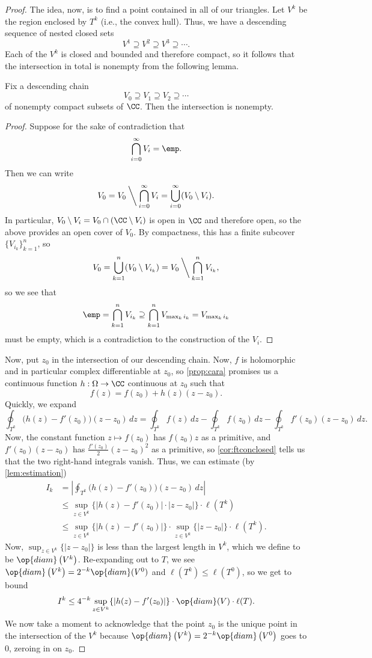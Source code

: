 \begin{proof}
	The idea, now, is to find a point contained in all of our triangles. Let $V^k$ be the region enclosed by $T^k$ (i.e., the convex hull). Thus, we have a descending sequence of nested closed sets
	\[V^1\supseteq V^2\supseteq V^3\supseteq\cdots.\]
	Each of the $V^k$ is closed and bounded and therefore compact, so it follows that the intersection in total is nonempty from the following lemma.
	\begin{lemma}
		Fix a descending chain
		\[V_0\supseteq V_1\supseteq V_2\supseteq\cdots\]
		of nonempty compact subsets of $\CC$. Then the intersection is nonempty.
	\end{lemma}
	\begin{proof}
		Suppose for the sake of contradiction that
		\[\bigcap_{i=0}^\infty V_i=\emp.\]
		Then we can write
		\[V_0=V_0\mathbin{\bigg\backslash}\bigcap_{i=0}^\infty V_i=\bigcup_{i=0}^\infty(V_0\setminus V_i).\]
		In particular, $V_0\setminus V_i=V_0\cap(\CC\setminus V_i)$ is open in $\CC$ and therefore open, so the above provides an open cover of $V_0$. By compactness, this has a finite subcover $\{V_{i_k}\}_{k=1}^n$, so
		\[V_0=\bigcup_{k=1}^n(V_0\setminus V_{i_k})=V_0\mathbin{\bigg\backslash}\bigcap_{k=1}^nV_{i_k},\]
		so we see that
		\[\emp=\bigcap_{k=1}^nV_{i_k}\supseteq\bigcap_{k=1}^nV_{\max_ki_k}=V_{\max_ki_k}\]
		must be empty, which is a contradiction to the construction of the $V_i$.
	\end{proof}
	Now, put $z_0$ in the intersection of our descending chain. Now, $f$ is holomorphic and in particular complex differentiable at $z_0$, so \autoref{prop:cara} promises us a continuous function $h:\Omega\to\CC$ continuous at $z_0$ such that
	\[f(z)=f(z_0)+h(z)(z-z_0).\]
	Quickly, we expand
	\[\oint_{T^k}\big(h(z)-f'(z_0)\big)(z-z_0)\,dz=\oint_{T^k}f(z)\,dz-\oint_{T^k}f(z_0)\,dz-\oint_{T^k}f'(z_0)(z-z_0)\,dz.\]
	Now, the constant function $z\mapsto f(z_0)$ has $f(z_0)z$ as a primitive, and $f'(z_0)(z-z_0)$ has $\frac{f'(z_0)}2(z-z_0)^2$ as a primitive, so \autoref{cor:ftconclosed} tells us that the two right-hand integrals vanish. Thus, we can estimate (by \autoref{lem:estimation})
	\begin{align*}
		I_k &= \left|\oint_{T^k}\big(h(z)-f'(z_0)\big)(z-z_0)\,dz\right| \\
		&\le \sup_{z\in V^k}\{|h(z)-f'(z_0)|\cdot|z-z_0|\}\cdot\ell\left(T^k\right) \\
		&\le \sup_{z\in V^k}\{|h(z)-f'(z_0)|\} \cdot\sup_{z\in V^k}\{|z-z_0|\}\cdot\ell\left(T^k\right).
	\end{align*}
	Now, $\sup_{z\in V^k}\{|z-z_0|\}$ is less than the largest length in $V^k$, which we define to be $\op{diam}\left(V^k\right)$. Re-expanding out to $T$, we see $\op{diam}\left(V^k\right)=2^{-k}\op{diam}(V^0)$ and $\ell\left(T^k\right)\le\ell(T^0)$, so we get to bound
	\[I^k\le 4^{-k}\sup_{z\in V^k}\{|h(z)-f'(z_0)|\}\cdot\op{diam}(V)\cdot\ell(T).\]
	We now take a moment to acknowledge that the point $z_0$ is the unique point in the intersection of the $V^k$ because $\op{diam}\left(V^k\right)=2^{-k}\op{diam}\left(V^0\right)$ goes to $0$, zeroing in on $z_0$.


\end{proof}
